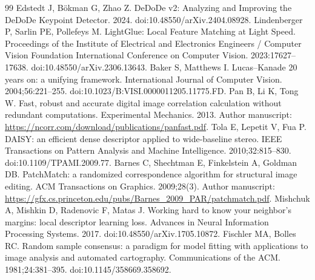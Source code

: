 \begin{thebibliography}{99}
 Edstedt J, B\"okman G, Zhao Z. DeDoDe v2: Analyzing and Improving the DeDoDe Keypoint Detector. 2024. doi:10.48550/arXiv.2404.08928.
 Lindenberger P, Sarlin PE, Pollefeys M. LightGlue: Local Feature Matching at Light Speed. Proceedings of the Institute of Electrical and Electronics Engineers / Computer Vision Foundation International Conference on Computer Vision. 2023:17627--17638. doi:10.48550/arXiv.2306.13643.
 Baker S, Matthews I. Lucas--Kanade 20 years on: a unifying framework. International Journal of Computer Vision. 2004;56:221--255. doi:10.1023/B:VISI.0000011205.11775.FD.
 Pan B, Li K, Tong W. Fast, robust and accurate digital image correlation calculation without redundant computations. Experimental Mechanics. 2013. Author manuscript: \url{https://ncorr.com/download/publications/panfast.pdf}.
 Tola E, Lepetit V, Fua P. DAISY: an efficient dense descriptor applied to wide-baseline stereo. IEEE Transactions on Pattern Analysis and Machine Intelligence. 2010;32:815--830. doi:10.1109/TPAMI.2009.77.
 Barnes C, Shechtman E, Finkelstein A, Goldman DB. PatchMatch: a randomized correspondence algorithm for structural image editing. ACM Transactions on Graphics. 2009;28(3). Author manuscript: \url{https://gfx.cs.princeton.edu/pubs/Barnes_2009_PAR/patchmatch.pdf}.
 Mishchuk A, Mishkin D, Radenovic F, Matas J. Working hard to know your neighbor's margins: local descriptor learning loss. Advances in Neural Information Processing Systems. 2017. doi:10.48550/arXiv.1705.10872.
 Fischler MA, Bolles RC. Random sample consensus: a paradigm for model fitting with applications to image analysis and automated cartography. Communications of the ACM. 1981;24:381--395. doi:10.1145/358669.358692.
\end{thebibliography}
